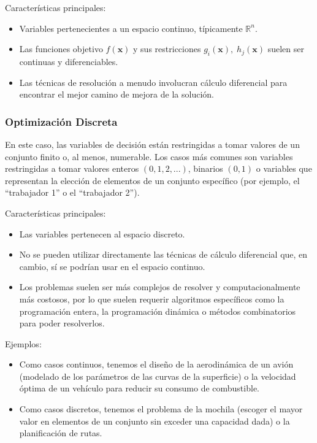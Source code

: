 \documentclass[12pt,a4paper]{book}
\begin{document}
Características principales:
\begin{itemize}
    \item Variables pertenecientes a un espacio continuo, típicamente $\mathbb{R}^n$.
    \item Las funciones objetivo $f(\mathbf{x})$ y sus restricciones $g_i(\mathbf{x}), \;h_j(\mathbf{x})$ suelen ser continuas y diferenciables.
    \item Las técnicas de resolución a menudo involucran cálculo diferencial para encontrar el mejor camino de mejora de la solución.
\end{itemize}

\subsubsection{Optimización Discreta}
En este caso, las variables de decisión están restringidas a tomar valores de un conjunto finito o, al menos, numerable. Los casos más comunes son variables restringidas a tomar valores enteros $(0,1,2,...)$, binarios $(0,1)$ o variables que representan la elección de elementos de un conjunto específico (por ejemplo, el ``trabajador 1'' o el ``trabajador 2'').

Características principales:
\begin{itemize}
    \item Las variables pertenecen al espacio discreto.
    \item No se pueden utilizar directamente las técnicas de cálculo diferencial que, en cambio, sí se podrían usar en el espacio continuo.
    \item Los problemas suelen ser más complejos de resolver y computacionalmente más costosos, por lo que suelen requerir algoritmos específicos como la programación entera, la programación dinámica o métodos combinatorios para poder resolverlos.
\end{itemize}

Ejemplos:
\begin{itemize}
    \item Como casos continuos, tenemos el diseño de la aerodinámica de un avión (modelado de los parámetros de las curvas de la superficie) o la velocidad óptima de un vehículo para reducir su consumo de combustible.
    \item Como casos discretos, tenemos el problema de la mochila (escoger el mayor valor en elementos de un conjunto sin exceder una capacidad dada) o la planificación de rutas.
\end{itemize}
\end{document}
